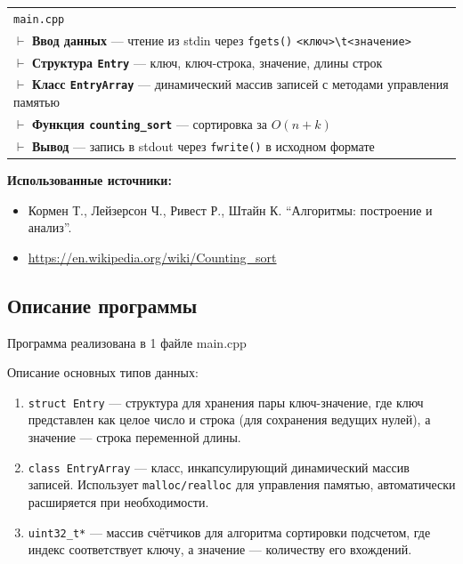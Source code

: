 \documentclass[12pt]{article}
\begin{document}
\begin{center}
\begin{tabular}{@{}l@{}}
\texttt{main.cpp} \\
\quad $\vdash$ \textbf{Ввод данных} --- чтение из stdin через \texttt{fgets()} \texttt{<ключ>\textbackslash t<значение>} \\
\quad $\vdash$ \textbf{Структура \texttt{Entry}} --- ключ, ключ-строка, значение, длины строк \\
\quad $\vdash$ \textbf{Класс \texttt{EntryArray}} --- динамический массив записей с методами управления памятью \\
\quad $\vdash$ \textbf{Функция \texttt{counting\_sort}} --- сортировка за $O(n + k)$ \\
\quad $\vdash$ \textbf{Вывод} --- запись в stdout через \texttt{fwrite()} в исходном формате \\
\end{tabular}
\end{center}

\vspace{0.3cm}


\textbf{Использованные источники:}
\begin{itemize}
\item Кормен Т., Лейзерсон Ч., Ривест Р., Штайн К. ``Алгоритмы: построение и анализ''.
\item \url{https://en.wikipedia.org/wiki/Counting\_sort}
\end{itemize} 

\subsection*{Описание программы}

Программа реализована в 1 файле main.cpp

Описание основных типов данных:
\begin{enumerate}
\item \texttt{struct Entry} — структура для хранения пары ключ-значение, где ключ представлен как целое число и строка (для сохранения ведущих нулей), а значение — строка переменной длины.
\item \texttt{class EntryArray} — класс, инкапсулирующий динамический массив записей. Использует \texttt{malloc/realloc} для управления памятью, автоматически расширяется при необходимости.
\item \texttt{uint32\_t*} — массив счётчиков для алгоритма сортировки подсчетом, где индекс соответствует ключу, а значение — количеству его вхождений.
\end{enumerate}
\end{document}
